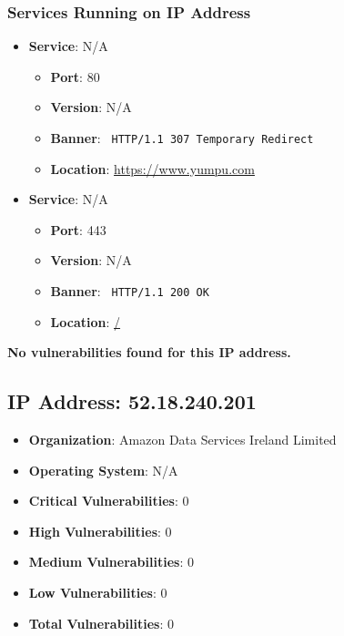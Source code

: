 \documentclass{article}
\begin{document}
\subsubsection*{Services Running on IP Address}

\begin{itemize}
    
        \item \textbf{Service}: N/A
        \begin{itemize}
            \item \textbf{Port}: 80
            \item \textbf{Version}:  N/A 
            \item \textbf{Banner}: \texttt{
                HTTP/1.1 307 Temporary Redirect
            }
            \item \textbf{Location}: \href{ https://www.yumpu.com }{ https://www.yumpu.com }
        \end{itemize}
    
        \item \textbf{Service}: N/A
        \begin{itemize}
            \item \textbf{Port}: 443
            \item \textbf{Version}:  N/A 
            \item \textbf{Banner}: \texttt{
                HTTP/1.1 200 OK
            }
            \item \textbf{Location}: \href{ / }{ / }
        \end{itemize}
    
\end{itemize}


\textbf{No vulnerabilities found for this IP address.}




\clearpage



\subsection*{IP Address: 52.18.240.201}

\begin{itemize}
    \item \textbf{Organization}: Amazon Data Services Ireland Limited
    \item \textbf{Operating System}:  N/A 
    \item \textbf{Critical Vulnerabilities}: 0
    \item \textbf{High Vulnerabilities}: 0
    \item \textbf{Medium Vulnerabilities}: 0
    \item \textbf{Low Vulnerabilities}: 0
    \item \textbf{Total Vulnerabilities}: 0
\end{itemize}
\end{document}
